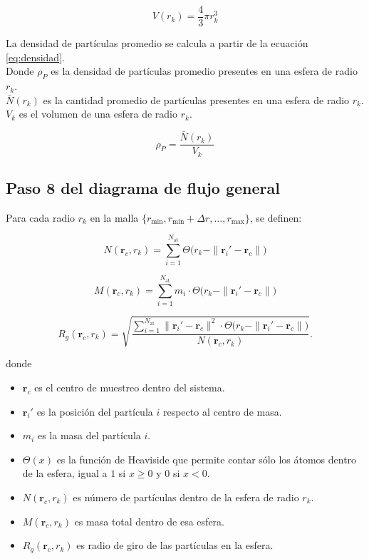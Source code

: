 	 
	 \begin{equation}
	 	V(r_k) = \frac{4}{3} \pi r_{k}^{3}
	 	\label{volumen}
	 \end{equation}
	 
	 La densidad de part\'{i}culas promedio se calcula a partir de la ecuaci\'{o}n \ref{eq:densidad}. \\
	 Donde \(\rho_{P}\) es la densidad de part\'{i}culas promedio presentes en una esfera de radio \(r_k\).\\
	 \(\bar N(r_{k})\) es la cantidad promedio de part\'{i}culas presentes en una esfera de radio \(r_k\).
	 \(V_{k}\) es el volumen de una esfera de radio \(r_{k}\).
	 
	 \begin{equation}
	 	\rho_P = \frac{\bar N(r_{k})}{V_{k}}
	 	\label{eq:densidad}
	 \end{equation}
	 

	\subsection{Paso 8 del diagrama de flujo general}

	Para cada radio $r_k$ en la malla $\{r_{\text{min}}, r_{\text{min}} + \Delta r, \ldots, r_{\text{max}}\}$, se definen:
	
	\begin{equation}
		N(\mathbf{r}_c, r_k) = \sum_{i=1}^{N_{\text{at}}} 
		\Theta\!\bigl(r_k - \|\mathbf{r}_i' - \mathbf{r}_c\|\bigr)
	\end{equation}
	
	\begin{equation}
		M(\mathbf{r}_c, r_k) = \sum_{i=1}^{N_{\text{at}}} 
		m_i \cdot \Theta\!\bigl(r_k - \|\mathbf{r}_i' - \mathbf{r}_c\|\bigr)
	\end{equation}
	
	\begin{equation}
		R_g(\mathbf{r}_c, r_k) = 
		\sqrt{\frac{\displaystyle\sum_{i=1}^{N_{\text{at}}} 
				\|\mathbf{r}_i' - \mathbf{r}_c\|^2 \cdot 
				\Theta\!\bigl(r_k - \|\mathbf{r}_i' - \mathbf{r}_c\|\bigr)}
			{N(\mathbf{r}_c, r_k)}}.
	\end{equation}
	
	donde
	\begin{itemize}
		\item $\mathbf{r}_c$ es el centro de muestreo dentro del sistema.
		\item $\mathbf{r}_i'$ es la posición del partícula $i$ respecto al centro de masa.
		\item $m_i$ es la masa del partícula $i$.
		\item $\Theta(x)$ es la función de Heaviside que permite contar sólo los átomos dentro de la esfera, igual a $1$ si $x \ge 0$ y $0$ si $x < 0$. 
		\item $N(\mathbf{r}_c, r_k)$ es número de partículas dentro de la esfera de radio $r_k$.
		\item $M(\mathbf{r}_c, r_k)$ es masa total dentro de esa esfera.
		\item $R_g(\mathbf{r}_c, r_k)$ es radio de giro de las partículas en la esfera.
	\end{itemize}
	
